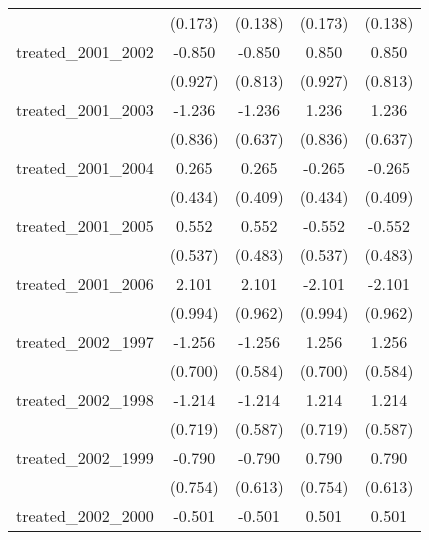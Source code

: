 {\begin{tabular}{l*{4}{c}}
            &     (0.173)         &     (0.138)         &     (0.173)         &     (0.138)         \\
[1em]
treated\_2001\_2002&      -0.850         &      -0.850         &       0.850         &       0.850         \\
            &     (0.927)         &     (0.813)         &     (0.927)         &     (0.813)         \\
[1em]
treated\_2001\_2003&      -1.236         &      -1.236         &       1.236         &       1.236         \\
            &     (0.836)         &     (0.637)         &     (0.836)         &     (0.637)         \\
[1em]
treated\_2001\_2004&       0.265         &       0.265         &      -0.265         &      -0.265         \\
            &     (0.434)         &     (0.409)         &     (0.434)         &     (0.409)         \\
[1em]
treated\_2001\_2005&       0.552         &       0.552         &      -0.552         &      -0.552         \\
            &     (0.537)         &     (0.483)         &     (0.537)         &     (0.483)         \\
[1em]
treated\_2001\_2006&       2.101\sym{*}  &       2.101\sym{*}  &      -2.101\sym{*}  &      -2.101\sym{*}  \\
            &     (0.994)         &     (0.962)         &     (0.994)         &     (0.962)         \\
[1em]
treated\_2002\_1997&      -1.256         &      -1.256\sym{*}  &       1.256         &       1.256\sym{*}  \\
            &     (0.700)         &     (0.584)         &     (0.700)         &     (0.584)         \\
[1em]
treated\_2002\_1998&      -1.214         &      -1.214\sym{*}  &       1.214         &       1.214\sym{*}  \\
            &     (0.719)         &     (0.587)         &     (0.719)         &     (0.587)         \\
[1em]
treated\_2002\_1999&      -0.790         &      -0.790         &       0.790         &       0.790         \\
            &     (0.754)         &     (0.613)         &     (0.754)         &     (0.613)         \\
[1em]
treated\_2002\_2000&      -0.501         &      -0.501         &       0.501         &       0.501         \\

\end{tabular}}
